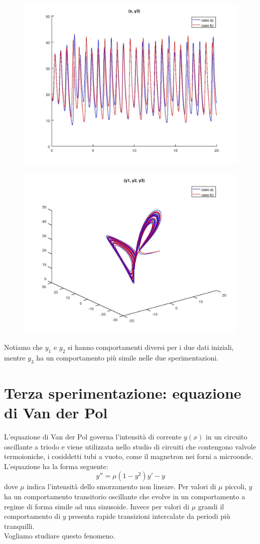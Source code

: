 \documentclass{article}
\begin{document}
	\begin{figure}[htp!]
	\centering 
	\includegraphics[width=\textwidth]{6_2_3.jpeg}
	\end{figure}
	\begin{figure}[htp!]
	\centering 
	\includegraphics[width=\textwidth]{6_2_4.jpeg}
	\end{figure}
	Notiamo che $y_1$ e $y_2$ si hanno comportamenti diversi per i due dati iniziali, mentre $y_3$ ha un comportamento più simile nelle due sperimentazioni.
	\newpage
	\section{Terza sperimentazione: equazione di Van der Pol}
	L'equazione di Van der Pol governa l'intensità di corrente $y(x)$ in un circuito oscillante a triodo e viene utilizzata nello studio di circuiti che contengono valvole termoioniche, i cosiddetti tubi a vuoto, come il magnetron nei forni a microonde. L’equazione ha la forma seguente:
	$$y''=\mu(1-y^2)y'-y$$
	dove $\mu$ indica l'intensità dello smorzamento non lineare. Per valori di $\mu$ piccoli, $y$ ha un comportamento transitorio oscillante che evolve in un comportamento a regime di
	forma simile ad una sinusoide. Invece per valori di $\mu$ grandi il comportamento di $y$ presenta rapide transizioni intercalate da periodi più tranquilli.\\
	Vogliamo studiare questo fenomeno.
\end{document}
